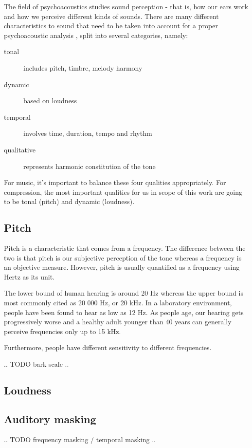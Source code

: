 The field of psychoacoustics studies sound perception - that is, how our ears work and how we perceive different kinds of sounds. There are many different characteristics to sound that need to be taken into account for a proper psychoacoustic analysis \cite{olson1967music}, split into several categories, namely:

\begin{description}
	\item[tonal] includes pitch, timbre, melody harmony
	\item[dynamic] based on loudness
	\item[temporal] involves time, duration, tempo and rhythm
	\item[qualitative] represents harmonic constitution of the tone
\end{description}

For music, it's important to balance these four qualities appropriately. For compression, the most important qualities for us in scope of this work are going to be tonal (pitch) and dynamic (loudness).

\subsection{Pitch}
Pitch is a characteristic that comes from a frequency. The difference between the two is that pitch is our subjective perception of the tone whereas a frequency is an objective measure. However, pitch is usually quantified as a frequency using Hertz as its unit.

The lower bound of human hearing is around 20 Hz whereas the upper bound is most commonly cited as 20 000 Hz, or 20 kHz. \cite{rosen1993hearing} In a laboratory environment, people have been found to hear as low as 12 Hz. As people age, our hearing gets progressively worse and a healthy adult younger than 40 years can generally perceive frequencies only up to 15 kHz. \cite{olson1967music}

Furthermore, people have different sensitivity to different frequencies.

.. TODO bark scale ..

\subsection{Loudness}

\subsection{Auditory masking}

.. TODO frequency masking / temporal masking ..
\cite{gelfand1990hearing}




